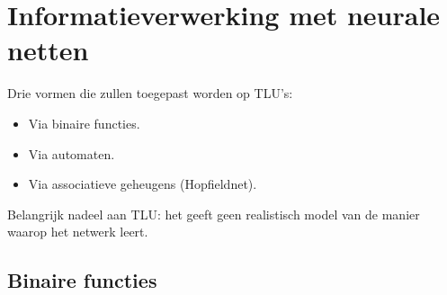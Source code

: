 \chapter{Informatieverwerking met neurale netten}
Drie vormen die zullen toegepast worden op TLU's:
\begin{itemize}
    \item Via binaire functies.
    \item Via automaten.
    \item Via associatieve geheugens (Hopfieldnet).
\end{itemize}

Belangrijk nadeel aan TLU: het geeft geen realistisch model van de manier waarop het netwerk leert.

\section{Binaire functies}
